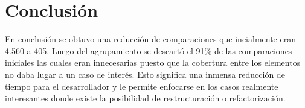 \section{Conclusión}

\par En conclusión se obtuvo una reducción de comparaciones que incialmente eran 4.560 a 405. Luego del agrupamiento se descartó el 91\% de las comparaciones iniciales las cuales eran innecesarias puesto que la cobertura entre los elementos no daba lugar a un caso de interés. Esto significa una inmensa reducción de tiempo para el desarrollador y le permite enfocarse en los casos realmente interesantes donde existe la posibilidad de restructuración o refactorización. 




